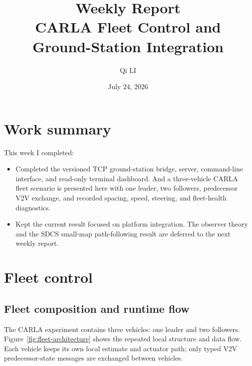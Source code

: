 \documentclass[11pt,a4paper]{article}
\title{\textbf{Weekly Report}\\[4pt]\large CARLA Fleet Control and Ground-Station Integration}
\author{Qi LI}
\date{July 24, 2026}
\begin{document}
\setcounter{tocdepth}{1}
\twocolumn[
\maketitle
\tableofcontents
\vspace{.3em}
]
\small
\section{Work summary}
This week I completed:
\begin{itemize}[leftmargin=*]
    \item Completed the versioned TCP ground-station bridge, server, command-line interface, and read-only terminal dashboard. And a three-vehicle CARLA fleet scenario is presented here with one leader, two followers, predecessor V2V exchange, and recorded spacing, speed, steering, and fleet-health diagnostics.
    \item Kept the current result focused on platform integration. The observer theory and the SDCS small-map path-following result are deferred to the next weekly report.
\end{itemize}

\section{Fleet control}
\subsection{Fleet composition and runtime flow}
The CARLA experiment contains three vehicles: one leader and two followers. Figure~\ref{fig:fleet-architecture} shows the repeated local structure and data flow. Each vehicle keeps its own local estimate and actuator path; only typed V2V predecessor-state messages are exchanged between vehicles.
\end{document}
